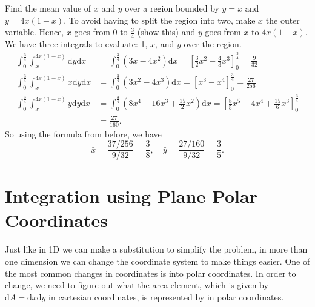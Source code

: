 \documentclass[../multivariate_calculus.tex]{subfiles}
\begin{document}
        \begin{example}
            Find the mean value of $x$ and $y$ over a region bounded by $y=x$ and $y=4x(1-x)$.
            To avoid having to split the region into two, make $x$ the outer variable.
            Hence, $x$ goes from 0 to $\frac{3}{4}$ (show this) and $y$ goes from $x$ to $4x(1-x)$.
            We have three integrals to evaluate: 1, $x$, and $y$ over the region.
            \begin{align}
                \int_0^\frac{3}{4}\int_x^{4x(1-x)}\mathrm{d}y\mathrm{d}x&=\int_0^\frac{3}{4}(3x-4x^2)\mathrm{d}x=\left[\frac{3}{2}x^2-\frac{4}{3}x^3\right]_0^\frac{3}{4}=\frac{9}{32}\\
                \int_0^\frac{3}{4}\int_x^{4x(1-x)}x\mathrm{d}y\mathrm{d}x&=\int_0^\frac{3}{4}(3x^2-4x^3)\mathrm{d}x=\left[x^3-x^4\right]_0^\frac{3}{4}=\frac{27}{256}\\
                \int_0^\frac{3}{4}\int_x^{4x(1-x)}y\mathrm{d}y\mathrm{d}x&=\int_0^\frac{3}{4}\left(8x^4-16x^3+\frac{15}{2}x^2\right)\mathrm{d}x=\left[\frac{8}{5}x^5-4x^4+\frac{15}{6}x^3\right]_0^\frac{3}{4}\\
                &=\frac{27}{160}.
            \end{align}
            So using the formula from before, we have
            \begin{equation}
                \bar{x}=\frac{37/256}{9/32}=\frac{3}{8},\quad\bar{y}=\frac{27/160}{9/32}=\frac{3}{5}.
            \end{equation}
        \end{example}

    \section{Integration using Plane Polar Coordinates}
        \paragraph{}
        Just like in 1D we can make a substitution to simplify the problem, in more than one dimension we can change the coordinate system to make things easier.
        One of the most common changes in coordinates is into polar coordinates.
        In order to change, we need to figure out what the area element, which is given by $\mathrm{d}A=\mathrm{d}x\mathrm{d}y$ in cartesian coordinates, is represented by in polar coordinates.
        
\end{document}
